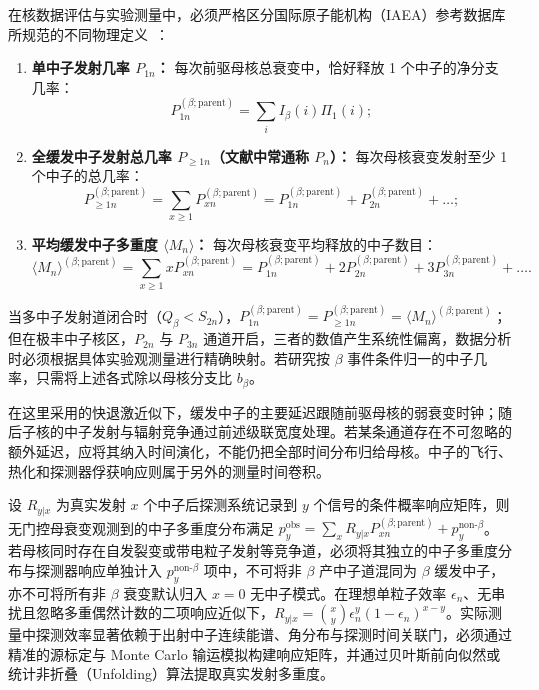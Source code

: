 在核数据评估与实验测量中，必须严格区分国际原子能机构（IAEA）参考数据库所规范的不同物理定义~\cite{dimitriou-2021-iaea-beta-delayed-neutron-database}：
\begin{enumerate}
\item \textbf{单中子发射几率 $P_{1n}$：} 每次前驱母核总衰变中，恰好释放 1 个中子的净分支几率：
\begin{equation}\label{eq:4-7-P1n-def}
P_{1n}^{(\beta;\mathrm{parent})} = \sum_{i} I_\beta(i) \Pi_1(i);
\end{equation}
\item \textbf{全缓发中子发射总几率 $P_{\ge 1n}$（文献中常通称 $P_n$）：} 每次母核衰变发射至少 1 个中子的总几率：
\begin{equation}\label{eq:4-7-P-atleast-1n-def}
P_{\ge 1n}^{(\beta;\mathrm{parent})} = \sum_{x \ge 1} P_{xn}^{(\beta;\mathrm{parent})} = P_{1n}^{(\beta;\mathrm{parent})} + P_{2n}^{(\beta;\mathrm{parent})} + \dots;
\end{equation}
\item \textbf{平均缓发中子多重度 $\langle M_n \rangle$：} 每次母核衰变平均释放的中子数目：
\begin{equation}\label{eq:4-7-mean-multiplicity-def}
\langle M_n \rangle^{(\beta;\mathrm{parent})} = \sum_{x \ge 1} x P_{xn}^{(\beta;\mathrm{parent})} = P_{1n}^{(\beta;\mathrm{parent})} + 2 P_{2n}^{(\beta;\mathrm{parent})} + 3 P_{3n}^{(\beta;\mathrm{parent})} + \dots.
\end{equation}
\end{enumerate}
当多中子发射道闭合时（$Q_\beta < S_{2n}$），$P_{1n}^{(\beta;\mathrm{parent})} = P_{\ge 1n}^{(\beta;\mathrm{parent})} = \langle M_n \rangle^{(\beta;\mathrm{parent})}$；但在极丰中子核区，$P_{2n}$ 与 $P_{3n}$ 通道开启，三者的数值产生系统性偏离，数据分析时必须根据具体实验观测量进行精确映射。若研究按 $\beta$ 事件条件归一的中子几率，只需将上述各式除以母核分支比 $b_\beta$。

在这里采用的快退激近似下，缓发中子的主要延迟跟随前驱母核的弱衰变时钟；随后子核的中子发射与辐射竞争通过前述级联宽度处理。若某条通道存在不可忽略的额外延迟，应将其纳入时间演化，不能仍把全部时间分布归给母核。中子的飞行、热化和探测器俘获响应则属于另外的测量时间卷积。

设 $R_{y|x}$ 为真实发射 $x$ 个中子后探测系统记录到 $y$ 个信号的条件概率响应矩阵，则无门控母衰变观测到的中子多重度分布满足 $p_y^{\mathrm{obs}} = \sum_x R_{y|x} P_{xn}^{(\beta;\mathrm{parent})} + p_y^{\mathrm{non\text{-}}\beta}$。若母核同时存在自发裂变或带电粒子发射等竞争道，必须将其独立的中子多重度分布与探测器响应单独计入 $p_y^{\mathrm{non\text{-}}\beta}$ 项中，不可将非 $\beta$ 产中子道混同为 $\beta$ 缓发中子，亦不可将所有非 $\beta$ 衰变默认归入 $x=0$ 无中子模式。在理想单粒子效率 $\epsilon_n$、无串扰且忽略多重偶然计数的二项响应近似下，$R_{y|x} = \binom{x}{y} \epsilon_n^y (1 - \epsilon_n)^{x-y}$。实际测量中探测效率显著依赖于出射中子连续能谱、角分布与探测时间关联门，必须通过精准的源标定与 Monte Carlo 输运模拟构建响应矩阵，并通过贝叶斯前向似然或统计非折叠（Unfolding）算法提取真实发射多重度。

